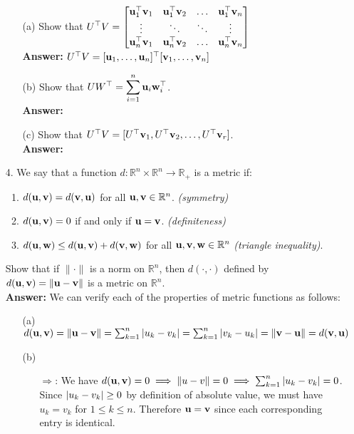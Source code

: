 \documentclass{article}
\newcommand{\bu}{{\bf u}}
\newcommand{\bv}{{\bf v}}
\newcommand{\bw}{{\bf w}}
\begin{document}
\begin{itemize}
          \begin{itemize}
              \item [(a)] Show that $\displaystyle U^{\top}V = \left[\begin{matrix} \bu_{1}^{\top}\bv_1 & \bu_{1}^{\top}\bv_2 & \ldots & \bu_{1}^{\top}\bv_{n} \\ \vdots & \ddots & \ddots & \vdots \\ \bu_{n}^{\top}\bv_{1} & \bu_{n}^{\top}\bv_{2} & \ldots & \bu_{n}^{\top}\bv_{n} \end{matrix}\right]$\\
              \textbf{Answer: } $U^{\top}V=[\bu_1,\ldots,\bu_n]^{\top}[\bv_1,\ldots,\bv_n]$
              \item [(b)] Show that $\displaystyle UW^{\top} = \sum_{i=1}^{n}\bu_{i}\bw_{i}^{\top}$.\\
              \textbf{Answer: }
              \item [(c)] Show that $U^{\top}V = [U^{\top}\bv_1, U^{\top}\bv_2,\ldots, U^{\top}\bv_{r}]$.\\
              \textbf{Answer: }
          \end{itemize}
    \item [4.] We say that a function $d: \mathbb{R}^{n}\times \mathbb{R}^{n} \to \mathbb{R}_{+}$ is a metric if:
          \begin{enumerate}
              \item $d(\bu,\bv) = d(\bv,\bu)$ for all $\bu,\bv\in\mathbb{R}^{n}$. {\em (symmetry)}
              \item $d(\bu,\bv) = 0$ if and only if $\bu = \bv$. {\em (definiteness)}
              \item $d(\bu,\bw) \leq d(\bu,\bv) + d(\bv,\bw)$ for all $\bu,\bv,\bw\in\mathbb{R}^{n}$ {\em (triangle inequality)}.
          \end{enumerate}
          Show that if $\|\cdot\|$ is a norm on $\mathbb{R}^{n}$, then $d(\cdot,\cdot)$ defined by $d(\bu,\bv) = \|\bu - \bv\|$ is a metric on $\mathbb{R}^{n}$.\\
          \textbf{Answer: } We can verify each of the properties of metric functions as follows:
          \begin{itemize}
              \item [(a)] $d(\bu,\bv)=\|\bu-\bv\|=\sum_{k=1}^n\abs{u_k-v_k}=\sum_{k=1}^n\abs{v_k-u_k}=\|\bv-\bu\|=d(\bv,\bu)$
              \item [(b)] \begin{itemize}
                        \item [$\Rightarrow$:] We have $d(\bu,\bv)=0\implies\|u-v\|=0\implies\sum_{k=1}^n\abs{u_k-v_k}=0$. Since $\abs{u_k-v_k}\geq 0$ by definition of absolute value, we must have $u_k=v_k$ for $1\leq k\leq n$. Therefore $\bu=\bv$ since each corresponding entry is identical.

\end{itemize}
\end{itemize}
\end{itemize}
\end{document}
